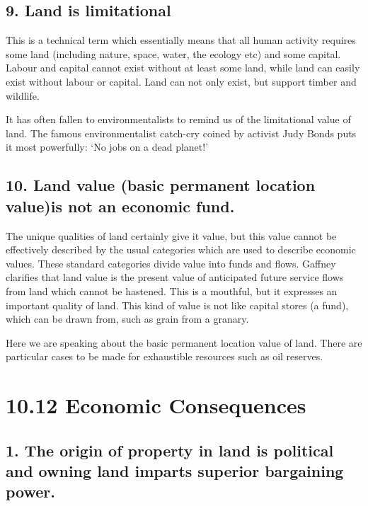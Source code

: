 \documentclass[]{tufte-handout}
\begin{document}
\hypertarget{land-is-limitational}{%
\subsection{9. Land is limitational}\label{land-is-limitational}}

This is a technical term which essentially means that all human activity
requires some land (including nature, space, water, the ecology etc) and
some capital. Labour and capital cannot exist without at least some
land, while land can easily exist without labour or capital. Land can
not only exist, but support timber and wildlife.

It has often fallen to environmentalists to remind us of the
limitational value of land. The famous environmentalist catch-cry coined
by activist Judy Bonds puts it most powerfully: `No jobs on a dead
planet!'

\hypertarget{land-value-basic-permanent-location-valueis-not-an-economic-fund.}{%
\subsection{10. Land value (basic permanent location value)is not an
economic
fund.}\label{land-value-basic-permanent-location-valueis-not-an-economic-fund.}}

The unique qualities of land certainly give it value, but this value
cannot be effectively described by the usual categories which are used
to describe economic values. These standard categories divide value into
funds and flows. Gaffney clarifies that land value is the present value
of anticipated future service flows from land which cannot be hastened.
This is a mouthful, but it expresses an important quality of land. This
kind of value is not like capital stores (a fund), which can be drawn
from, such as grain from a granary.

Here we are speaking about the basic permanent location value of land.
There are particular cases to be made for exhaustible resources such as
oil reserves.

\hypertarget{economic-consequences}{%
\section{10.12 Economic Consequences}\label{economic-consequences}}

\hypertarget{the-origin-of-property-in-land-is-political-and-owning-land-imparts-superior-bargaining-power.}{%
\subsection{1. The origin of property in land is political and owning
land imparts superior bargaining
power.}\label{the-origin-of-property-in-land-is-political-and-owning-land-imparts-superior-bargaining-power.}}
\end{document}
